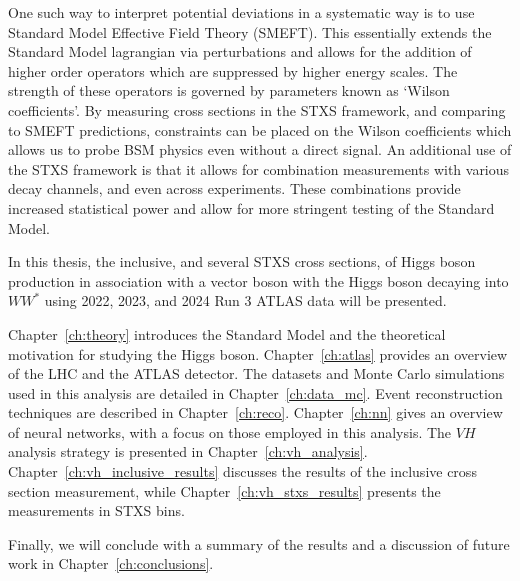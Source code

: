 One such way to interpret potential deviations in a systematic way is to use Standard Model Effective Field Theory (SMEFT). This essentially extends the Standard Model lagrangian via perturbations and allows for the addition of higher order operators which are suppressed by higher energy scales. The strength of these operators is governed by parameters known as `Wilson coefficients'. By measuring cross sections in the STXS framework, and comparing to SMEFT predictions, constraints can be placed on the Wilson coefficients which allows us to probe BSM physics even without a direct signal.
An additional use of the STXS framework is that it allows for combination measurements with various decay channels, and even across experiments. These combinations provide increased statistical power and allow for more stringent testing of the Standard Model.

In this thesis, the inclusive, and several STXS cross sections, of Higgs boson production in association with a vector boson with the Higgs boson decaying into $WW^{*}$ using 2022, 2023, and 2024 Run 3 ATLAS data will be presented. 

Chapter~\ref{ch:theory} introduces the Standard Model and the theoretical motivation for studying the Higgs boson. Chapter~\ref{ch:atlas} provides an overview of the LHC and the ATLAS detector. The datasets and Monte Carlo simulations used in this analysis are detailed in Chapter~\ref{ch:data_mc}. Event reconstruction techniques are described in Chapter~\ref{ch:reco}. Chapter~\ref{ch:nn} gives an overview of neural networks, with a focus on those employed in this analysis. The $VH$ analysis strategy is presented in Chapter~\ref{ch:vh_analysis}. Chapter~\ref{ch:vh_inclusive_results} discusses the results of the inclusive cross section measurement, while Chapter~\ref{ch:vh_stxs_results} presents the measurements in STXS bins.

Finally, we will conclude with a summary of the results and a discussion of future work in Chapter~\ref{ch:conclusions}.


